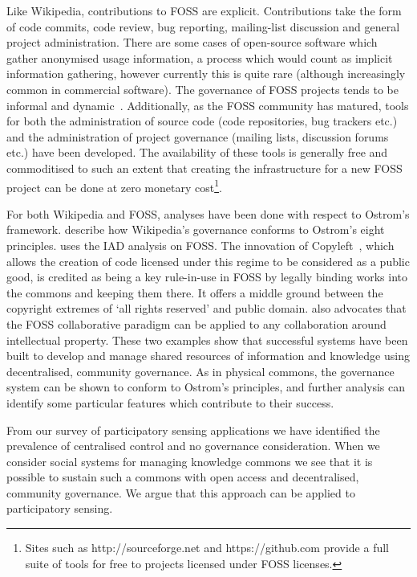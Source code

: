Like Wikipedia, contributions to \ac{FOSS} are explicit. Contributions take the form of code commits, code review, bug reporting, mailing-list discussion and general project administration. 
There are some cases of open-source software which gather anonymised usage information, a process which would count as implicit information gathering, however currently this is quite rare (although increasingly common in commercial software). 
The governance of \ac{FOSS} projects tends to be informal and dynamic~\citep{Schweik2007}. 
Additionally, as the \ac{FOSS} community has matured, tools for both the administration of source code (code repositories, bug trackers etc.) and the administration of project governance (mailing lists, discussion forums etc.) have been developed. 
The availability of these tools is generally free and commoditised to such an extent that creating the infrastructure for a new \ac{FOSS} project can be done at zero monetary cost\footnote{Sites such as http://sourceforge.net and https://github.com provide a full suite of tools for free to projects licensed under \ac{FOSS} licenses.}.

For both Wikipedia and \ac{FOSS}, analyses have been done with respect to Ostrom's framework. 
 describe how Wikipedia's governance conforms to Ostrom's eight principles. 
 uses the \ac{IAD} analysis on \ac{FOSS}. The innovation of Copyleft~\citep{Stallman1999}, which allows the creation of code licensed under this regime to be considered as a public good, is credited as being a key rule-in-use in \ac{FOSS} by legally binding works into the commons and keeping them there. 
It offers a middle ground between the copyright extremes of `all rights reserved' and public domain. 
 also advocates that the \ac{FOSS} collaborative paradigm can be applied to any collaboration around intellectual property. 
These two examples show that successful systems have been built to develop and manage shared resources of information and knowledge using decentralised, community governance. 
As in physical commons, the governance system can be shown to conform to Ostrom's principles, and further analysis can identify some particular features which contribute to their success.

From our survey of participatory sensing applications we have identified the
prevalence of centralised control and no governance consideration. When we
consider social systems for managing knowledge commons we see that it is
possible to sustain such a commons with open access and decentralised,
community governance. We argue that this approach can be applied to
participatory sensing.

